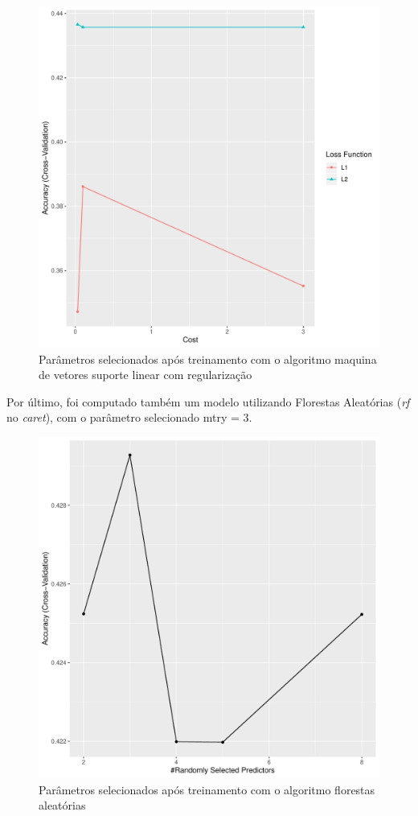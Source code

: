 \begin{figure}[H]
    \centering
    \caption{Parâmetros selecionados após treinamento com o algoritmo maquina de vetores suporte linear com regularização} \label{fig-fluxograma}
    \includegraphics[scale=0.5]{figs/plot_svm-linear.pdf}
\end{figure}

	Por último, foi computado também um modelo utilizando Florestas
Aleatórias (\emph{rf} no \emph{caret}), com o parâmetro selecionado mtry
= 3.

\begin{figure}[H]
    \centering
    \caption{Parâmetros selecionados após treinamento com o algoritmo florestas aleatórias} 
    \includegraphics[scale=0.5]{figs/plot_rf.pdf}
\end{figure}

